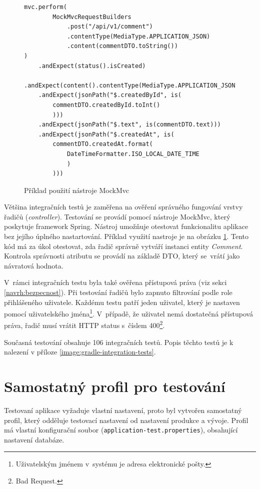         \begin{figure}
        \begin{verbatim}
mvc.perform(
        MockMvcRequestBuilders
            .post("/api/v1/comment")
            .contentType(MediaType.APPLICATION_JSON)
            .content(commentDTO.toString())
)
    .andExpect(status().isCreated)
    .andExpect(content().contentType(MediaType.APPLICATION_JSON))
    .andExpect(jsonPath("$.createdById", is(
        commentDTO.createdById.toInt()
        )))
    .andExpect(jsonPath("$.text", is(commentDTO.text)))
    .andExpect(jsonPath("$.createdAt", is(
        commentDTO.createdAt.format(
            DateTimeFormatter.ISO_LOCAL_DATE_TIME
            )
        )))

        \end{verbatim}
        \caption{Příklad použití nástroje MockMvc} 
        \label{code:mockmvc}
    \end{figure}
    Většina integračních testů je zaměřena na ověření správného fungování vrstvy řadičů (\textit{controller}). Testování se provádí pomocí nástroje MockMvc\cite{mock-mvc}, který poskytuje framework Spring. Nástroj umožňuje otestovat funkcionalitu aplikace bez jejího úplného nastartování. Příklad využití nastroje je na obrázku \ref{code:mockmvc}. Tento kód má za úkol otestovat, zda řadič správně vytváří instanci entity \textit{Comment}. Kontrola správnosti atributu se provádí na základě DTO, který se~vrátí jako návratová hodnota.
    
    V~rámci integračních testu byla také ověřena přístupová práva (viz sekci \ref{navrh:bezpecnost}). Při testování řadičů bylo zapnuto filtrování podle role přihlášeného uživatele. Každému testu patří jeden uživatel, který je nastaven pomocí uživatelského jména\footnote{Uživatelským jménem v~systému je adresa elektronické pošty.}. V~případě, že uživatel nemá dostatečná přístupová práva, řadič musí vrátit HTTP status s~číslem 400\footnote{Bad Request.}.
    
     Současná testování obsahuje 106 integračních testů. Popis těchto testů je k nalezení v příloze \ref{image:gradle-integration-tests}.
    
\section{Samostatný profil pro testování}

    Testovaní aplikace vyžaduje vlastní nastavení, proto byl vytvořen samostatný profil, který odděluje testovací nastavení od nastavení produkce a vývoje. Profil má vlastní konfigurační soubor (\verb|application-test.properties|), obsahující nastavení databáze.
    
